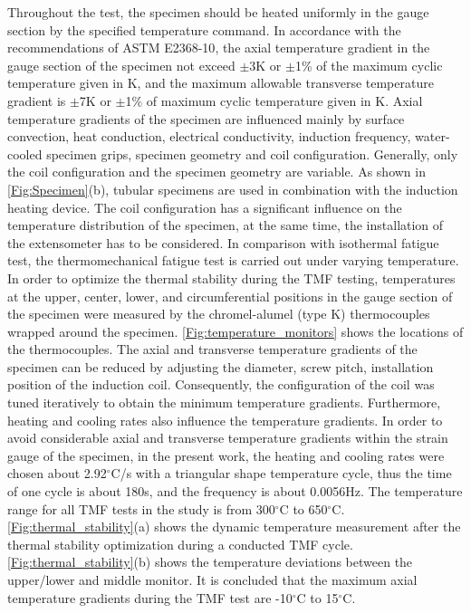 Throughout the test, the specimen should be heated uniformly in the gauge section by the specified temperature command. In accordance with the recommendations of ASTM E2368-10\cite{ASTME2005}, the axial temperature gradient in the gauge section of the specimen not exceed $\pm$3K or $\pm$1\% of the
maximum cyclic temperature given in K, and the maximum allowable transverse temperature gradient is $\pm$7K or $\pm$1\% of maximum cyclic temperature given in K.
Axial temperature gradients of the specimen are influenced mainly by surface convection, heat conduction, electrical conductivity, induction frequency, water-cooled specimen grips, specimen geometry and coil configuration. Generally, only the coil configuration and the specimen geometry are variable. As shown in \ref{Fig:Specimen}(b), tubular specimens are used in combination with the induction heating device. The coil configuration has a significant influence on the temperature distribution of the specimen, at the same time, the installation of the extensometer has to be considered\cite{Hahner2006}.
In comparison with isothermal fatigue test, the thermomechanical fatigue test is carried out under varying temperature.
In order to optimize the thermal stability during the TMF testing, temperatures at the upper, center, lower, and circumferential positions in the gauge section of the specimen were measured by the chromel-alumel (type K) thermocouples wrapped around the specimen. \ref{Fig:temperature_monitors} shows the locations of the thermocouples.
The axial and transverse temperature gradients of the specimen can be reduced by adjusting the diameter, screw pitch, installation position of the induction coil.
Consequently, the configuration of the coil was tuned iteratively to obtain the minimum temperature gradients.
Furthermore, heating and cooling rates also influence the temperature gradients.
In order to avoid considerable axial and transverse temperature gradients within the strain gauge of the specimen, in the present work, the heating and cooling rates were chosen about 2.92$^\circ$C/s with a triangular shape temperature cycle, thus the time of one cycle is about 180s, and the frequency is about 0.0056Hz.
The temperature range for all TMF tests in the study is from 300$^\circ$C to 650$^\circ$C. \ref{Fig:thermal_stability}(a) shows the dynamic temperature measurement after the thermal stability optimization during a conducted TMF cycle. \ref{Fig:thermal_stability}(b) shows the temperature
deviations between the upper/lower and middle monitor. It is concluded that the maximum axial temperature gradients during the TMF test are -10$^\circ$C to 15$^\circ$C.

